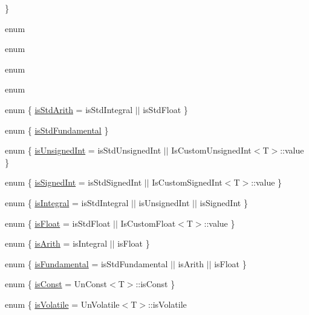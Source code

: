 \begin{DoxyCompactItemize}
 \}
\item 
enum 
\item 
enum 
\item 
enum 
\item 
enum 
\item 
enum \{ \mbox{\hyperlink{classUtil_1_1TypeTraits_a1cfd1423cce5a0b762ee8f5c9c2f004ea3017f19abc6084d7e144891aaf5adb0f}{is\+Std\+Arith}} = is\+Std\+Integral $\vert$$\vert$ is\+Std\+Float
 \}
\item 
enum \{ \mbox{\hyperlink{classUtil_1_1TypeTraits_ad2a782274bd24165717b068f49fd6851ab40fb122d222179d83db4acfdd8d3887}{is\+Std\+Fundamental}}
 \}
\item 
enum \{ \mbox{\hyperlink{classUtil_1_1TypeTraits_a88f2e9de4143a8e63402e6ec6830c5f5a491d7fd4750cb0d1a2dcbeb5fc3456d1}{is\+Unsigned\+Int}} = is\+Std\+Unsigned\+Int $\vert$$\vert$ Is\+Custom\+Unsigned\+Int$<$T$>$\+:\+:value
 \}
\item 
enum \{ \mbox{\hyperlink{classUtil_1_1TypeTraits_a3ba071c65cca8d8bc84e736a182a1569a238eb902c14c6c61c1f4baa46e56c461}{is\+Signed\+Int}} = is\+Std\+Signed\+Int $\vert$$\vert$ Is\+Custom\+Signed\+Int$<$T$>$\+:\+:value
 \}
\item 
enum \{ \mbox{\hyperlink{classUtil_1_1TypeTraits_ad28ca1ecffbf544a467e2bf0eddc3b41ae3cb8ddfe928cd1a6dc3438e54a5b74f}{is\+Integral}} = is\+Std\+Integral $\vert$$\vert$ is\+Unsigned\+Int $\vert$$\vert$ is\+Signed\+Int
 \}
\item 
enum \{ \mbox{\hyperlink{classUtil_1_1TypeTraits_abeef28fc167db26d4a304c6c4f650bd3a53a8c88c40192f095328053a89109888}{is\+Float}} = is\+Std\+Float $\vert$$\vert$ Is\+Custom\+Float$<$T$>$\+:\+:value
 \}
\item 
enum \{ \mbox{\hyperlink{classUtil_1_1TypeTraits_a01d5d54588585427e0715f4921024601aacdb8f6332a550ea4ebaf1ff8014b127}{is\+Arith}} = is\+Integral $\vert$$\vert$ is\+Float
 \}
\item 
enum \{ \mbox{\hyperlink{classUtil_1_1TypeTraits_a5f6c0ebf34a75e27262aae3a527392f9a20a90cf2934e5a2c26599d7f051f8675}{is\+Fundamental}} = is\+Std\+Fundamental $\vert$$\vert$ is\+Arith $\vert$$\vert$ is\+Float
 \}
\item 
enum \{ \mbox{\hyperlink{classUtil_1_1TypeTraits_a99cd5bc4b087089f352434d7f482e1cba26a0a78aeec8fa5c5c02c774b73585cd}{is\+Const}} = Un\+Const$<$T$>$\+:\+:is\+Const
 \}
\item 
enum \{ \mbox{\hyperlink{classUtil_1_1TypeTraits_abc08b845a07e81bbc4a304c6f3b24b51ad832c3ecd956e173f499202b8a249453}{is\+Volatile}} = Un\+Volatile$<$T$>$\+:\+:is\+Volatile
$$
\end{DoxyCompactItemize}
